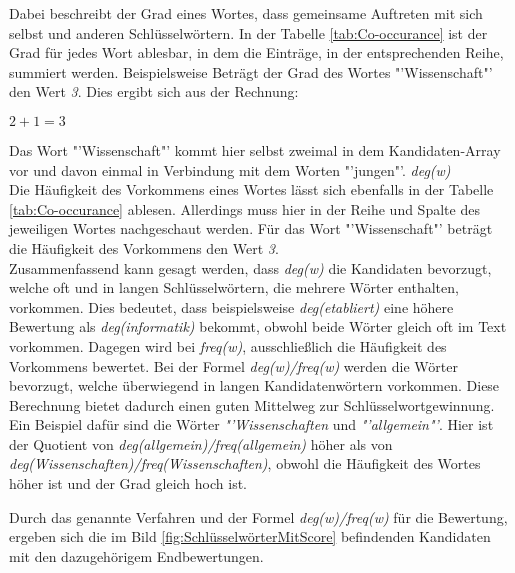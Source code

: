 		Dabei beschreibt der Grad eines Wortes, dass gemeinsame Auftreten mit sich selbst und anderen Schlüsselwörtern. In der Tabelle \ref{tab:Co-occurance} ist der Grad für jedes Wort ablesbar, in dem die Einträge, in der entsprechenden Reihe, summiert werden. Beispielsweise Beträgt der Grad des Wortes "'Wissenschaft"' den Wert \textit{3}. Dies ergibt sich aus der Rechnung:
		\begin{center}
			$2 + 1 = 3$
		\end{center}
		Das Wort "'Wissenschaft"' kommt hier selbst zweimal in dem Kandidaten-Array vor und davon einmal in Verbindung mit dem Worten "'jungen"'. \textit{deg(w)}\\
		Die Häufigkeit des Vorkommens eines Wortes lässt sich ebenfalls in der Tabelle \ref{tab:Co-occurance} ablesen. Allerdings muss hier in der Reihe und Spalte des jeweiligen Wortes nachgeschaut werden. Für das Wort "'Wissenschaft"' beträgt die Häufigkeit des Vorkommens den Wert \textit{3}.\\
		Zusammenfassend kann gesagt werden, dass \textit{deg(w)} die Kandidaten bevorzugt, welche oft und in langen Schlüsselwörtern, die mehrere Wörter enthalten, vorkommen. Dies bedeutet, dass beispielsweise \textit{deg(etabliert)} eine höhere Bewertung als \textit{deg(informatik)} bekommt, obwohl beide Wörter gleich oft im Text vorkommen. Dagegen wird bei \textit{freq(w)}, ausschließlich die Häufigkeit des Vorkommens bewertet. Bei der Formel \textit{deg(w)/freq(w)} werden die Wörter bevorzugt, welche überwiegend in langen Kandidatenwörtern vorkommen. Diese Berechnung bietet dadurch einen guten Mittelweg zur Schlüsselwortgewinnung. Ein Beispiel dafür sind die Wörter \textit{"'Wissenschaften} und \textit{"'allgemein"'}. Hier ist der Quotient von \textit{deg(allgemein)/freq(allgemein)} höher als von \textit{deg(Wissenschaften)/freq(Wissenschaften)}, obwohl die Häufigkeit des Wortes höher ist und der Grad gleich hoch ist. \cite{rose2010automatic}
		
		Durch das genannte Verfahren und der Formel \textit{deg(w)/freq(w)} für die Bewertung, ergeben sich die im Bild \ref{fig:SchlüsselwörterMitScore} befindenden Kandidaten mit den dazugehörigem Endbewertungen. \cite{rose2010automatic}
		
